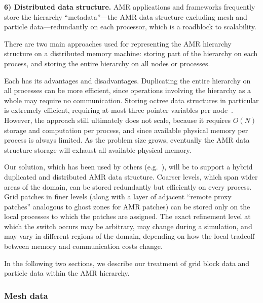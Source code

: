 \documentclass[11pt,letterpaper]{article}
\begin{document}

\textbf{6) Distributed data structure.}  AMR applications and
frameworks frequently store the hierarchy ``metadata''---the AMR data
structure excluding mesh and particle data---redundantly on each
processor, which is a roadblock to scalability. 

There are two main
approaches used for representing the AMR hierarchy structure on a
distributed memory machine: storing part of the hierarchy on each
process, and storing the entire hierarchy on all nodes or processes.

Each has its advantages and disadvantages.  Duplicating the entire
hierarchy on all processes can be more efficient, since operations
involving the hierarchy as a whole may require no communication.
Storing octree data structures in particular is extremely efficient,
requiring at most three pointer variables per node~\cite{FrPe02}.
However, the approach still ultimately does not scale, because it
requires $O(N)$ storage and computation per process, and since
available physical memory per process is always limited.  As the
problem size grows, eventually the AMR data structure storage will
exhaust all available physical memory.

Our solution, which has been used by others
(e.g.~\cite{@@@hybrid-storage}), will be to support a hybrid
duplicated and distributed AMR data structure.  Coarser levels, which
span wider areas of the domain, can be stored redundantly but
efficiently on every process.  Grid patches in finer levels (along
with a layer of adjacent ``remote proxy patches'' analogous to ghost
zones for AMR patches) can be stored only on the local processes to
which the patches are assigned.  The exact refinement level at which
the switch occurs may be arbitrary, may change during a simulation,
and may vary in different regions of the domain, depending on how the
local tradeoff between memory and communication costs change.

In the following two sections, we describe our treatment of grid block
data and particle data within the AMR hierarchy.

\subsubsection{Mesh data} \label{sss:design-fields}
\end{document}
